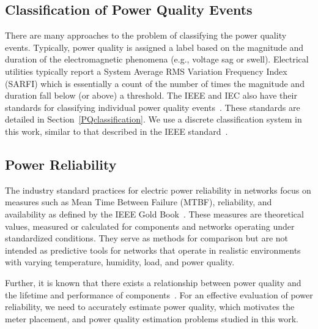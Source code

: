 \subsection{Classification of Power Quality Events}
There are many approaches to the problem of classifying the power quality events. Typically, power quality is assigned a label based on the magnitude and duration of the electromagnetic phenomena (e.g., voltage sag or swell). Electrical utilities typically report a System Average RMS Variation Frequency Index (SARFI) which is essentially a count of the number of times the magnitude and duration fall below (or above) a threshold. The IEEE and IEC also have their standards for classifying individual power quality events~\cite{iec_61000, IEEE09_1159}. These standards are detailed in Section~\ref{PQclassification}. We use a discrete classification system in this work, similar to that described in the IEEE standard~\cite{IEEE09_1159}.


\subsection{Power Reliability}
The industry standard practices for electric power reliability in networks focus on measures such as Mean Time Between Failure (MTBF), reliability, and availability as defined by the IEEE Gold Book~\cite{goldbook}. These measures are theoretical values, measured or calculated for components and networks operating under standardized conditions. They serve as methods for comparison but are not intended as predictive tools for networks that operate in realistic environments with varying temperature, humidity, load, and power quality.

Further, it is known that there exists a relationship between power quality and the lifetime and performance of components~\cite{iti_curve}. For an effective evaluation of power reliability, we need to accurately estimate power quality, which motivates the meter placement, and power quality estimation problems studied in this work.

